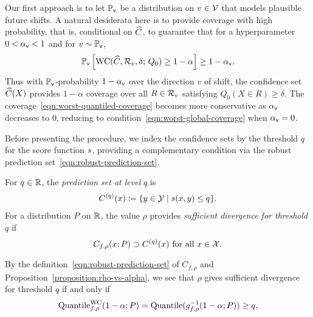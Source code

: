 Our first approach is to let $\mathbb{P}_{\mathsf{v}}$ be a distribution on $v \in \mathcal{V}$ that models plausible future shifts. 
A natural desiderata here is to provide
coverage with high probability, that is, conditional on $\widehat{C}$, to
guarantee that for a hyperparameter $0 < \alpha_{\mathsf{v}} < 1$ and
for $v \sim \mathbb{P}_{\mathsf{v}}$,
\begin{align}
  \label{eqn:worst-quantiled-coverage}
  \mathbb{P}_{\mathsf{v}} \left[ \textup{WC}(\widehat{C}, \mathcal{R}_v, \delta; \, Q_0) \geq 1 - \alpha \right]
  \geq 1-\alpha_{\mathsf{v}}.
\end{align}
Thus with $\mathbb{P}_{\mathsf{v}}$-probability $1 - \alpha_{\mathsf{v}}$ over the direction $v$ of shift,
the confidence set $\widehat{C}(X)$ provides $1-\alpha$ coverage over all $R
\in \mathcal{R}_v$ satisfying $Q_0(X\in R) \ge \delta$.  The
coverage~\eqref{eqn:worst-quantiled-coverage} becomes more conservative as
$\alpha_{\mathsf{v}}$ decreases to $0$, reducing to
condition~\eqref{eqn:worst-global-coverage} when $\alpha_{\mathsf{v}} = 0$.

Before presenting the procedure, we index the confidence sets by the
threshold $q$ for the score function $s$, providing a complementary
condition via the robust prediction set~\eqref{eqn:robust-prediction-set}.

\begin{definition}
  \label{def:smallest-rho}
  For $q \in \mathbb{R}$, the \emph{prediction set at level} $q$ is
  \begin{align*}
    C^{(q)}(x) \coloneqq \{ y \in \mathcal{Y} \mid s(x,y) \le q \}.
  \end{align*}
  For a distribution $P$ on $\mathbb{R}$, the
  value $\rho$ provides
  \emph{sufficient divergence for threshold $q$} if
  \begin{equation*}
    C_{f,\rho}(x; P) \supset C^{(q)}(x) ~ \mbox{for~all~} x \in \mathcal{X}.
  \end{equation*}
\end{definition}
\noindent
By the definition~\eqref{eqn:robust-prediction-set} of
$C_{f,\rho}$ and Proposition~\ref{proposition:rho-vs-alpha}, we see that $\rho$ 
gives sufficient divergence for threshold $q$ if and only if
\begin{equation*}
  \textup{Quantile}^{\textup{WC}}_{f,\rho}(1 - \alpha; P)
  = \textup{Quantile}(g_{f,\rho}^{-1}(1 - \alpha; P)) \ge q.
\end{equation*}

